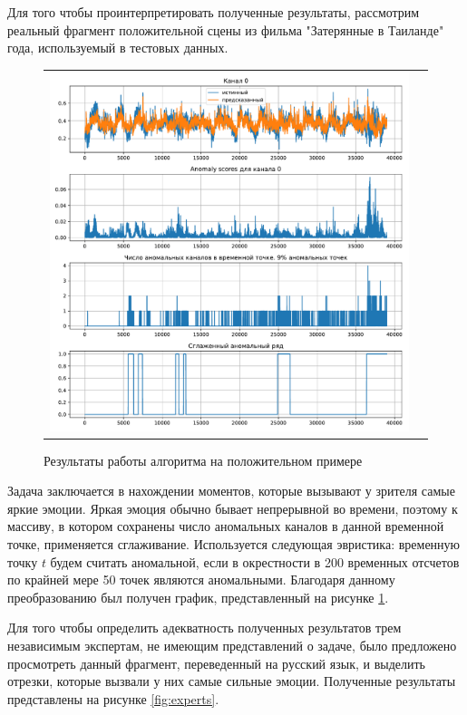 \documentclass{article}
\begin{document}
Для того чтобы проинтерпретировать полученные результаты, рассмотрим реальный фрагмент положительной сцены из фильма "Затерянные в Таиланде"  года, используемый в тестовых данных. 

\begin{figure}[h]
\begin{tabular}{cc}
  \includegraphics[width=160mm]{9.pdf}
\end{tabular}
\caption{Результаты работы алгоритма на положительном примере}
\label{fig:pos}
\end{figure}

Задача заключается в нахождении моментов, которые вызывают у зрителя самые яркие эмоции. Яркая эмоция обычно бывает непрерывной во времени, поэтому к массиву, в котором сохранены число аномальных каналов в данной временной точке, применяется сглаживание. Используется следующая эвристика: временную точку $t$ будем считать аномальной, если в окрестности в 200 временных отсчетов по крайней мере 50 точек являются аномальными. Благодаря данному преобразованию был получен график, представленный на рисунке \ref{fig:pos}. 


Для того чтобы определить адекватность полученных результатов трем независимым экспертам, не имеющим представлений о задаче, было предложено просмотреть данный фрагмент, переведенный на русский язык, и выделить отрезки, которые вызвали у них самые сильные эмоции. Полученные результаты представлены на рисунке \ref{fig:experts}.
\end{document}
